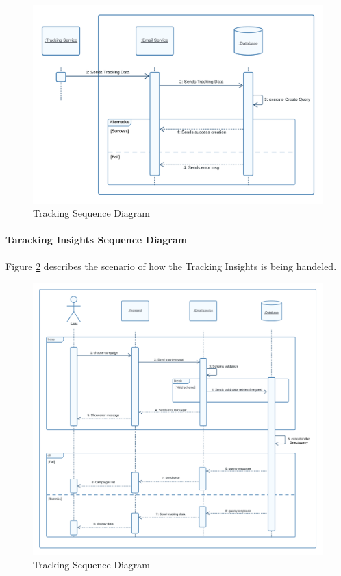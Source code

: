 \begin{figure}[ht]
	\centering
	\includegraphics[width=0.8\linewidth]{Images/Sprint3/sequence diag sprint 3/tracking insights sequence diag.png}
	\caption{ Tracking Sequence Diagram}
	\label{fig:Sprint 3 Saving Taracking Data Sequence Diagram}
\end{figure}

\paragraph{ Taracking Insights Sequence Diagram}

Figure \ref{fig:Sprint 3 Taracking Insights Sequence Diagram} describes the scenario of how the Tracking Insights is being handeled.

\begin{figure}[ht]
	\centering
	\includegraphics[width=\linewidth]{Images/Sprint3/sequence diag sprint 3/view insights.png}
	\caption{ Tracking Sequence Diagram}
	\label{fig:Sprint 3 Taracking Insights Sequence Diagram}
\end{figure}

\clearpage